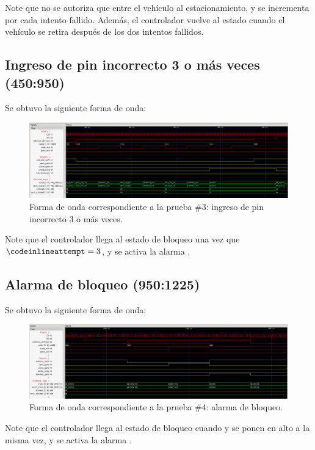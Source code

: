 Note que no se autoriza que entre el vehículo al estacionamiento, y se incrementa  por cada intento fallido. 
Además, el controlador vuelve al estado  cuando el vehículo se retira después de los dos intentos fallidos.
\subsection{Ingreso de pin incorrecto 3 o más veces (450:950)}
Se obtuvo la siguiente forma de onda:

\begin{figure}[!h]
    \centering
    \includegraphics[width = \linewidth]{figs/prueba3.png}
    \caption{Forma de onda correspondiente a la prueba \#3: ingreso de pin incorrecto 3 o más veces.}
    \label{fig5}
\end{figure}

Note que el controlador llega al estado de bloqueo una vez que $\code{attempt} = 3$, y se activa la alarma .
\subsection{Alarma de bloqueo (950:1225)}
Se obtuvo la siguiente forma de onda:

\begin{figure}[!h]
    \centering
    \includegraphics[width = \linewidth]{figs/prueba4.png}
    \caption{Forma de onda correspondiente a la prueba \#4: alarma de bloqueo.}
    \label{fig6}
\end{figure}

Note que el controlador llega al estado de bloqueo cuando  y  se ponen en alto a la misma vez, y se activa la alarma .

